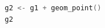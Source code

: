 \begin{lstlisting}[language=c++,label={code:05_11},caption={Plotting data points on a canvas}]
g2 <- g1 + geom_point()
g2
\end{lstlisting}
